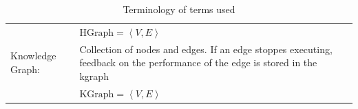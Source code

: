 \begin{table}[ht]
\begin{tabular}[t]{l p{10cm}}
        & $ \text{HGraph} = \left\langle V, E \right\rangle $\\
Knowledge Graph:& Collection of nodes and edges. If an edge stoppes executing, feedback on the performance of the edge is stored in the \ac{kgraph}\\
        & $ \text{KGraph} = \left\langle V, E \right\rangle $\\
\end{tabular}
\caption{Terminology of terms used}
\label{table:proposed_method_terminology}
\end{table}

% 


